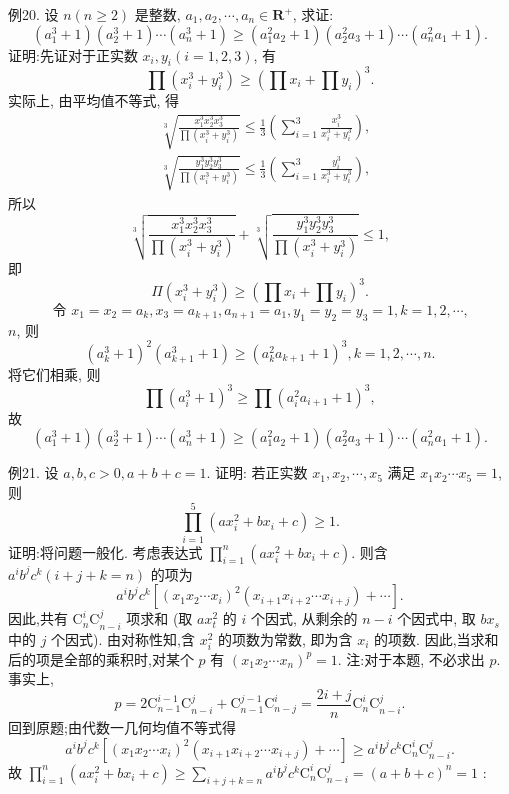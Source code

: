 例20. 设 $n(n \geqslant 2)$ 是整数, $a_1, a_2, \cdots, a_n \in \mathbf{R}^{+}$, 求证:
$$
\left(a_1^3+1\right)\left(a_2^3+1\right) \cdots\left(a_n^3+1\right) \geqslant\left(a_1^2 a_2+1\right)\left(a_2^2 a_3+1\right) \cdots\left(a_n^2 a_1+1\right) .
$$
证明:先证对于正实数 $x_i, y_i(i=1,2,3)$, 有
$$
\prod\left(x_i^3+y_i^3\right) \geqslant\left(\prod x_i+\prod y_i\right)^3 .
$$
实际上, 由平均值不等式, 得
$$
\begin{aligned}
& \sqrt[3]{\frac{x_1^3 x_2^3 x_3^3}{\prod\left(x_i^3+y_i^3\right)}} \leqslant \frac{1}{3}\left(\sum_{i=1}^3 \frac{x_i^3}{x_i^3+y_i^3}\right), \\
& \sqrt[3]{\frac{y_1^3 y_2^3 y_3^3}{\prod\left(x_i^3+y_i^3\right)}} \leqslant \frac{1}{3}\left(\sum_{i=1}^3 \frac{y_i^3}{x_i^3+y_i^3}\right),
\end{aligned}
$$
所以
$$
\sqrt[3]{\frac{x_1^3 x_2^3 x_3^3}{\prod\left(x_i^3+y_i^3\right)}}+\sqrt[3]{\frac{y_1^3 y_2^3 y_3^3}{\prod\left(x_i^3+y_i^3\right)}} \leqslant 1,
$$
即
$$
\Pi\left(x_i^3+y_i^3\right) \geqslant\left(\prod x_i+\prod y_i\right)^3 .
$$
$$
\text { 令 } x_1=x_2=a_k, x_3=a_{k+1}, a_{n+1}=a_1, y_1=y_2=y_3=1, k=1,2, \cdots \text {, }
$$
$n$, 则
$$
\left(a_k^3+1\right)^2\left(a_{k+1}^3+1\right) \geqslant\left(a_k^2 a_{k+1}+1\right)^3, k=1,2, \cdots, n .
$$
将它们相乘, 则
$$
\prod\left(a_i^3+1\right)^3 \geqslant \prod\left(a_i^2 a_{i+1}+1\right)^3,
$$
故
$$
\left(a_1^3+1\right)\left(a_2^3+1\right) \cdots\left(a_n^3+1\right) \geqslant\left(a_1^2 a_2+1\right)\left(a_2^2 a_3+1\right) \cdots\left(a_n^2 a_1+1\right) .
$$



例21. 设 $a, b, c>0, a+b+c=1$. 证明: 若正实数 $x_1, x_2, \cdots, x_5$ 满足 $x_1 x_2 \cdots x_5=1$, 则
$$
\prod_{i=1}^5\left(a x_i^2+b x_i+c\right) \geqslant 1 .
$$
证明:将问题一般化.
考虑表达式 $\prod_{i=1}^n\left(a x_i^2+b x_i+c\right)$.
则含 $a^i b^j c^k(i+j+k=n)$ 的项为
$$
a^i b^j c^k\left[\left(x_1 x_2 \cdots x_i\right)^2\left(x_{i+1} x_{i+2} \cdots x_{i+j}\right)+\cdots\right] .
$$
因此,共有 $\mathrm{C}_n^i \mathrm{C}_{n-i}^j$ 项求和 (取 $a x_t^2$ 的 $i$ 个因式, 从剩余的 $n-i$ 个因式中, 取 $b x_s$ 中的 $j$ 个因式).
由对称性知,含 $x_i^2$ 的项数为常数, 即为含 $x_i$ 的项数.
因此,当求和后的项是全部的乘积时,对某个 $p$ 有 $\left(x_1 x_2 \cdots x_n\right)^p=1$.
注:对于本题, 不必求出 $p$. 事实上,
$$
p=2 \mathrm{C}_{n-1}^{i-1} \mathrm{C}_{n-i}^j+\mathrm{C}_{n-1}^{j-1} \mathrm{C}_{n-j}^i=\frac{2 i+j}{n} \mathrm{C}_n^i \mathrm{C}_{n-i}^j .
$$
回到原题;由代数一几何均值不等式得
$$
a^i b^j c^k\left[\left(x_1 x_2 \cdots x_i\right)^2\left(x_{i+1} x_{i+2} \cdots x_{i+j}\right)+\cdots\right] \geqslant a^i b^j c^k \mathrm{C}_n^i \mathrm{C}_{n-i}^j .
$$
故 $\prod_{i=1}^n\left(a x_i^2+b x_i+c\right) \geqslant \sum_{i+j+k=n} a^i b^j c^k \mathrm{C}_n^i \mathrm{C}_{n-i}^j=(a+b+c)^n=1$ :



